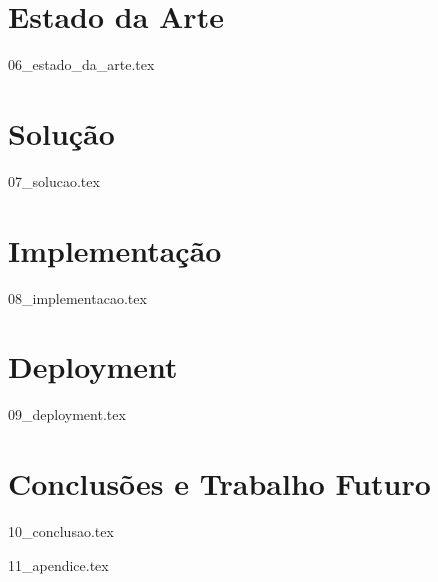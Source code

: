 \documentclass[
  oneside,
  11pt, a4paper,
  footinclude=true,
  headinclude=true,
  cleardoublepage=empty
]{scrbook}
\begin{document}
	\chapter{Estado da Arte}
    {06_estado_da_arte.tex}

	\chapter{Solução}
    {07_solucao.tex}

	\chapter{Implementação}
    {08_implementacao.tex}

	\chapter{Deployment}
    {09_deployment.tex}
		
	\chapter{Conclusões e Trabalho Futuro}
    {10_conclusao.tex}
			

	

	
    {11_apendice.tex}
	
\end{document}
